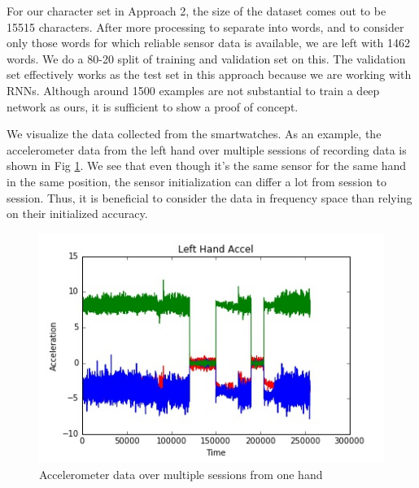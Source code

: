 \documentclass[10pt,twocolumn,letterpaper]{article}
\begin{document}
For our character set in Approach 2, the size of the dataset comes out to be 15515 characters. After more processing to separate into words, and to consider only those words for which reliable sensor data is available, we are left with 1462 words. We do a 80-20 split of training and validation set on this. The validation set effectively works as the test set in this approach because we are working with RNNs. Although around 1500 examples are not substantial to train a deep network as ours, it is sufficient to show a proof of concept.

We visualize the data collected from the smartwatches. As an example, the accelerometer data from the left hand over multiple sessions of recording data is shown in Fig \ref{fig:accel_data}. We see that even though it's the same sensor for the same hand in the same position, the sensor initialization can differ a lot from session to session. Thus, it is beneficial to consider the data in frequency space than relying on their initialized accuracy.

\begin{figure}[t]
\begin{center}
   \includegraphics[width=0.99\linewidth]{./accel_data.jpg}
\end{center}
   \caption{Accelerometer data over multiple sessions from one hand}
\label{fig:accel_data}
\end{figure}
\end{document}
